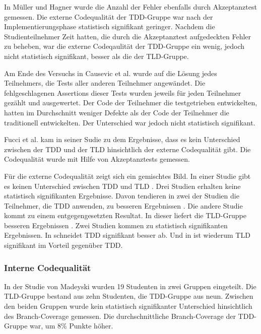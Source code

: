 In Müller und Hagner \cite{Muller2002ExperimentProgramming} wurde die Anzahl der Fehler ebenfalls durch Akzeptanztest gemessen. Die externe Codequalität der TDD-Gruppe war nach der Implementierungsphase statistisch signifikant geringer. Nachdem die Studienteilnehmer Zeit hatten, die durch die Akzeptanztest aufgedeckten Fehler zu beheben, war die externe Codeqaulität der TDD-Gruppe ein wenig, jedoch nicht statistisch signifikant, besser als die der TLD-Gruppe.

Am Ende des Versuchs in Causevic et al. \cite{Causevic2012TestExperiment} wurde auf die Lösung jedes Teilnehmers, die Tests aller anderen Teilnehmer angewändet. Die fehlgeschlagenen Assertions dieser Tests wurden jeweils für jeden Teilnehmer gezählt und ausgewertet. Der Code der Teilnehmer die testgetrieben entwickelten, hatten im Durchschnitt weniger Defekte  als der Code der Teilnehmer die traditionell entwickelten. Der Unterschied war jedoch nicht statistisch signifikant.

Fucci et al. \cite{Fucci2016AnApproach} kam in seiner Sudie zu dem Ergebnisse, dass es kein Unterschied zwischen der TDD und der TLD hinsichtlich der externe Codequalität gibt. Die Codequalität wurde mit Hilfe von Akzeptanztests gemessen.

Für die externe Codequalität zeigt sich ein gemischtes Bild. In einer Studie gibt es keinen Unterschied zwischen TDD und TLD \cite{Fucci2016AnApproach}. Drei Studien erhalten keine statistisch signifikanten Ergebnisse. Davon tendieren in zwei der Studien die Teilnehmer, die TDD anwenden, zu besseren Ergebnissen \cite{Muller2002ExperimentProgramming, Causevic2012TestExperiment}. Die andere Studie kommt zu einem entgegengesetzten Resultat. In dieser liefert die TLD-Gruppe besseren Ergebnissen \cite{Gupta2007AnDevelopment}. Zwei Studien kommen zu statistisch signifikanten Ergebnissen. In \cite{Gupta2007AnDevelopment} schneidet TDD signifikant besser ab. Und in \cite{Madeyski2005PreliminaryQuality} ist wiederum TLD signifikant im Vorteil gegenüber TDD.

\subsubsection{Interne Codequalität} In der Studie von Madeyski \cite{Madeyski2010TheExperiment} wurden 19 Studenten in zwei Gruppen eingeteilt. Die TLD-Gruppe bestand aus zehn Studenten, die TDD-Gruppe aus neun. Zwischen den beiden Gruppen wurde kein statistisch signifikanter Unterschied hinsichtlich des Branch-Coverage gemessen. Die durchschnittliche Branch-Coverage  der TDD-Gruppe war, um 8\% Punkte höher.

